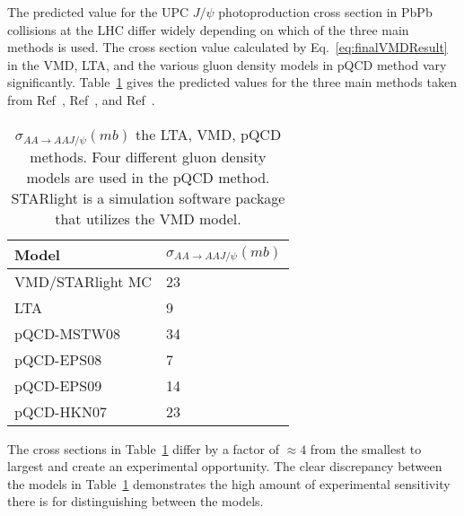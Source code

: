   The predicted value for the UPC $J/\psi$ photoproduction cross section in 
    PbPb collisions at the LHC differ widely depending on which of the three 
    main methods is used. 
  The cross section value calculated by Eq.~\ref{eq:finalVMDResult} in the 
    VMD, LTA, and the various gluon density models in pQCD method vary 
    significantly.
  Table~\ref{tab:allXsec} gives the predicted values for the three main methods
    taken from Ref~\cite{pQCD2013.02}, Ref~\cite{lta2011.09}, and Ref~\cite{vmd1999}.
  \begin{table} 
   \centering
   \begin{tabular}{|l|l|} 
     \hline
     Model & $\sigma_{AA\rightarrow AAJ/\psi} (mb)$ \\ \hline \hline
     VMD/STARlight MC & 23 \\ \hline
     LTA & 9 \\ \hline
     pQCD-MSTW08 & 34 \\ \hline
     pQCD-EPS08 & 7  \\ \hline
     pQCD-EPS09 & 14 \\ \hline
     pQCD-HKN07 & 23 \\ \hline
     \hline
   \end{tabular}
   \caption{$\sigma_{AA\rightarrow AAJ/\psi} (mb)$
    the LTA, VMD, pQCD methods. Four different gluon density models are used 
    in the pQCD method. STARlight is a simulation software package that utilizes 
    the VMD model.}
   \label{tab:allXsec}
  \end{table}
  The cross sections in Table~\ref{tab:allXsec} differ by a factor of $\approx4$ 
    from the smallest to largest and create an experimental opportunity. 
  The clear discrepancy between the models in Table~\ref{tab:allXsec} 
    demonstrates the high amount of experimental sensitivity there is for 
    distinguishing between the models. 


